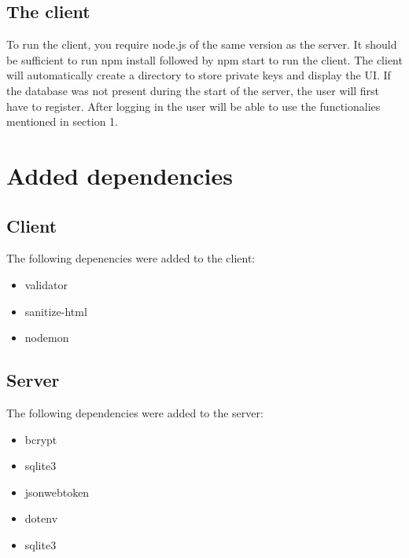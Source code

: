 \documentclass[a4paper]{article}
\begin{document}
\subsection{The client}
To run the client, you require node.js of the same version as the server. It should be sufficient to run npm install followed by npm start to run the client. The client will automatically create a directory to store private keys and display the UI.
If the database was not present during the start of the server, the user will first have to register. After logging in the user will be able to use the functionalies mentioned in section 1.
\section{Added dependencies}
\subsection{Client}
The following depenencies were added to the client:
\begin{itemize}
    \item validator
    \item sanitize-html
    \item nodemon
\end{itemize}
\subsection{Server}
The following dependencies were added to the server:
\begin{itemize}
    \item bcrypt
    \item sqlite3
    \item jsonwebtoken
    \item dotenv
    \item sqlite3
\end{itemize}
\end{document}
